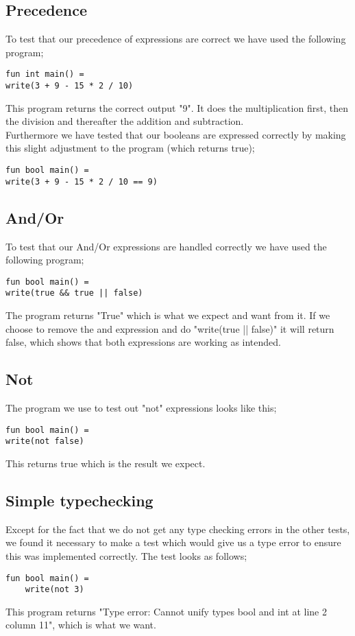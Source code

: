 \documentclass[12pt]{article}
\begin{document}
\subsection{Precedence}
To test that our precedence of expressions are correct we have used the following program;
\begin{verbatim}
fun int main() =
write(3 + 9 - 15 * 2 / 10)
\end{verbatim}
This program returns the correct output "9". It does the multiplication first, then the division and thereafter the addition and subtraction.\\
Furthermore we have tested that our booleans are expressed correctly by making this slight adjustment to the program (which returns true);
\begin{verbatim}
fun bool main() =
write(3 + 9 - 15 * 2 / 10 == 9)
\end{verbatim}
\subsection{And/Or}
To test that our And/Or expressions are handled correctly we have used the following program;
\begin{verbatim}
fun bool main() =
write(true && true || false)
\end{verbatim}
The program returns "True" which is what we expect and want from it. If we choose to remove the and expression and do "write(true || false)" it will return false, which shows that both expressions are working as intended.
\subsection{Not}
The program we use to test out "not" expressions looks like this;
\begin{verbatim}
fun bool main() =
write(not false)
\end{verbatim}
This returns true which is the result we expect.
\subsection{Simple typechecking}
Except for the fact that we do not get any type checking errors in the other tests, we found it necessary to make a test which would give us a type error to ensure this was implemented correctly. The test looks as follows;
\begin{verbatim}
fun bool main() =
    write(not 3)
\end{verbatim}
This program returns "Type error: Cannot unify types bool and int at line 2 column 11", which is what we want.
\end{document}
